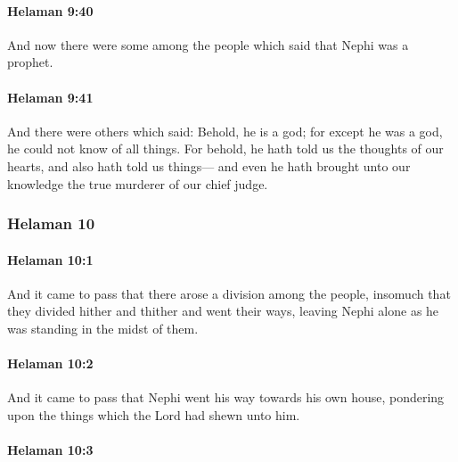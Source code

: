 		\paragraph{Helaman 9:40} %
			\label{HELAMAN-9-40}

			And now there were some among the people
			which said that Nephi was a prophet.

		\paragraph{Helaman 9:41} %
			\label{HELAMAN-9-41}

			And there were others which said:
			Behold, he is a god;
			for except he was a god,
			he could not know of all things.
			For behold, he hath told us the thoughts of our hearts,
			and also hath told us things---
			and even he hath brought unto our knowledge
			the true murderer of our chief judge.

	\subsubsection{Helaman 10} %
		\label{HELAMAN-10}
		
		\paragraph{Helaman 10:1} %
			\label{HELAMAN-10-1}

			And it came to pass that there arose a division among the people,
			insomuch that they divided hither and thither and went their ways,
			leaving Nephi alone as he was standing in the midst of them.

		\paragraph{Helaman 10:2} %
			\label{HELAMAN-10-2}

			And it came to pass that Nephi went his way towards his own house,
			pondering upon the things which the Lord had shewn unto him.

		\paragraph{Helaman 10:3} %
			\label{HELAMAN-10-3}

